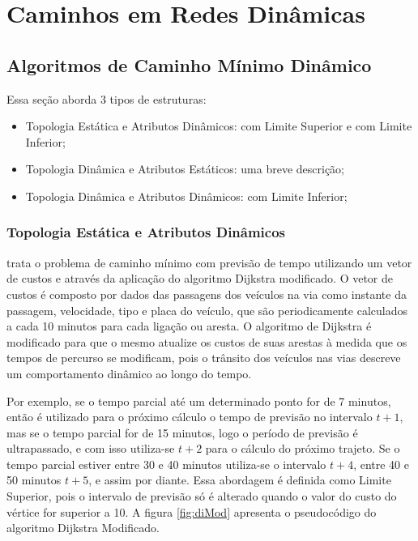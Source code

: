 \section{Caminhos em Redes Dinâmicas}


\subsection{Algoritmos de Caminho Mínimo Dinâmico}
Essa seção aborda 3 tipos de estruturas:
\begin{itemize}
\item Topologia Estática e Atributos Dinâmicos: com Limite Superior \cite{leonard} e com Limite Inferior;
\item Topologia Dinâmica e Atributos Estáticos: uma breve descrição;
\item Topologia Dinâmica e Atributos Dinâmicos: com Limite Inferior;
\end{itemize}

\subsubsection{Topologia Estática e Atributos Dinâmicos}
\cite{leonard} trata o problema de caminho mínimo com previsão de tempo utilizando um vetor de custos e
através da aplicação do algoritmo Dijkstra modificado. O vetor de custos é composto por dados das passagens 
dos veículos na via como instante da passagem, velocidade, tipo e placa do veículo, que são periodicamente calculados
a cada 10 minutos para cada ligação ou aresta. O algoritmo de Dijkstra é modificado para que o mesmo atualize os custos
de suas arestas à medida que os tempos de percurso se modificam, pois o trânsito dos veículos nas vias descreve um
comportamento dinâmico ao longo do tempo.

Por exemplo, se o tempo parcial até um determinado ponto for de 7 minutos, então
é utilizado para o próximo cálculo o tempo de previsão no intervalo $t + 1$, mas se o tempo parcial for de 15 minutos, logo
o período de previsão é ultrapassado, e com isso utiliza-se $t + 2$ para o cálculo do próximo trajeto. Se o tempo parcial
estiver entre 30 e 40 minutos utiliza-se o intervalo $t + 4$, entre 40 e 50 minutos $t + 5$, e assim por diante.
Essa abordagem é definida como Limite Superior, pois o intervalo de previsão só é alterado quando o 
valor do custo do vértice for superior a 10. A figura \ref{fig:diMod} apresenta o pseudocódigo do algoritmo Dijkstra Modificado.

